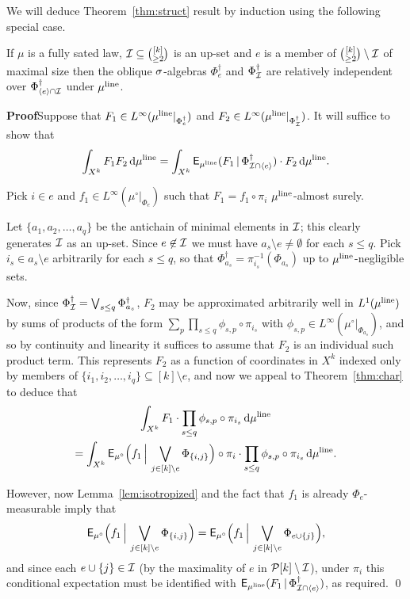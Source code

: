 \documentclass[11pt]{article}
\begin{document}
We will deduce Theorem~\ref{thm:struct} result by induction using
the following special case.

\begin{lem}
If $\mu$ is a fully sated law, $\mathcal{I} \subseteq \binom{[k]}{\geq 2}$ is
an up-set and $e$ is a member of $\binom{[k]}{\geq 2}\setminus \mathcal{I}$
of maximal size then the oblique $\sigma$-algebras $\Phi^\dag_e$ and
$\Phi^\dag_{\mathcal{I}}$ are relatively independent over $\Phi^\dag_{\langle
e\rangle \cap\mathcal{I}}$ under $\mu^{\mathrm{line}}$.
\end{lem}

\textbf{Proof}\quad Suppose that $F_1 \in
L^\infty(\mu^{\mathrm{line}}|_{\Phi^\dag_e})$ and $F_2 \in
L^\infty(\mu^{\mathrm{line}}|_{\Phi^\dag_{\mathcal{I}}})$. It will suffice to show that
\[\int_{X^k}F_1F_2\,\mathrm{d}\mu^{\mathrm{line}} = \int_{X^k}\mathsf{E}_{\mu^{\mathrm{line}}}(F_1\,|\,\Phi^\dag_{\mathcal{I}\cap\langle
e\rangle})\cdot F_2\,\mathrm{d}\mu^{\mathrm{line}}.\]

Pick $i\in e$ and $f_1 \in L^\infty(\mu^\circ|_{\Phi_e})$ such that
$F_1 = f_1\circ\pi_i$ $\mu^{\mathrm{line}}$-almost surely.

Let $\{a_1,a_2,\ldots,a_q\}$ be the antichain of minimal elements in
$\mathcal{I}$; this clearly generates $\mathcal{I}$ as an up-set. Since $e \not\in\mathcal{I}$
we must have $a_s \setminus e\not=\emptyset$ for each $s \leq q$.
Pick $i_s \in a_s\setminus e$ arbitrarily for each $s\leq q$, so
that $\Phi^\dag_{a_s} = \pi_{i_s}^{-1}(\Phi_{a_s})$ up to
$\mu^{\mathrm{line}}$-negligible sets.

Now, since $\Phi^\dag_{\mathcal{I}} = \bigvee_{s\leq q}\Phi^\dag_{a_s}$,
$F_2$ may be approximated arbitrarily well in $L^1(\mu^{\mathrm{line}})$ by
sums of products of the form $\sum_p\prod_{s\leq
q}\phi_{s,p}\circ\pi_{i_s}$ with $\phi_{s,p}\in
L^\infty(\mu^\circ|_{\Phi_{a_s}})$, and so by continuity and
linearity it suffices to assume that $F_2$ is an individual such
product term. This represents $F_2$ as a function of coordinates in
$X^k$ indexed only by members of $\{i_1,i_2,\ldots,i_q\}\subseteq
[k]\setminus e$, and now we appeal to Theorem~\ref{thm:char} to
deduce that
\begin{multline*}
\int_{X^k}F_1\cdot \prod_{s\leq q}\phi_{s,p}\circ\pi_{i_s}\,\mathrm{d}\mu^{\mathrm{line}}\\
=
\int_{X^k}\mathsf{E}_{\mu^\circ}\Big(f_1\,\Big|\,\bigvee_{j\in[k]\setminus
e}\Phi_{\{i,j\}}\Big)\circ\pi_i\cdot \prod_{s\leq
q}\phi_{s,p}\circ\pi_{i_s}\,\mathrm{d}\mu^{\mathrm{line}}.
\end{multline*}

However, now Lemma~\ref{lem:isotropized} and the fact that $f_1$ is
already $\Phi_e$-measurable imply that
\[\mathsf{E}_{\mu^\circ}\Big(f_1\,\Big|\,\bigvee_{j\in[k]\setminus e}\Phi_{\{i,j\}}\Big) = \mathsf{E}_{\mu^\circ}\Big(f_1\,\Big|\,\bigvee_{j\in [k]\setminus e} \Phi_{e \cup \{j\}}\Big),\]
and since each $e \cup \{j\} \in \mathcal{I}$ (by the maximality of $e$ in
$\mathcal{P}[k]\setminus\mathcal{I}$), under $\pi_i$ this conditional expectation
must be identified with
$\mathsf{E}_{\mu^{\mathrm{line}}}(F_1\,|\,\Phi^\dag_{\mathcal{I}\cap\langle e\rangle})$, as
required. \qed
\end{document}
